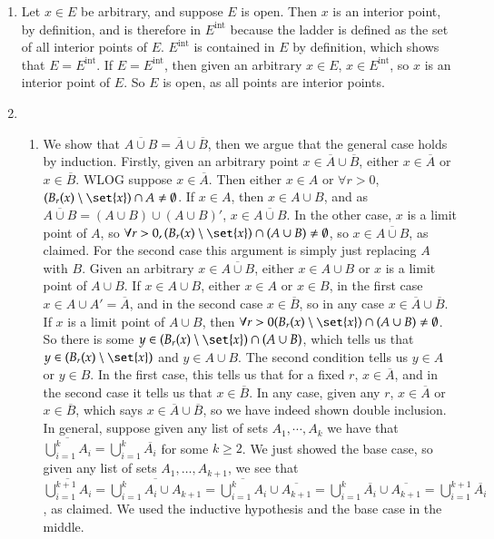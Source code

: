\documentclass[12pt]{article}
\theoremstyle{definition}
\theoremstyle{remark}
\begin{document}
\begin{enumerate}[leftmargin=\labelsep]
		\item Let $x \in E$ be arbitrary, and suppose $E$ is open. Then $x$ is an interior point, by definition, and is therefore in $E^\mathrm{int}$ because the ladder is defined as the set of all interior points of $E$. $E^\mathrm{int}$ is contained in $E$ by definition, which shows that $E = E^\mathrm{int}$. If $E = E^\mathrm{int}$, then given an arbitrary $x \in E$, $x \in E^{\mathrm{int}}$, so $x$ is an interior point of $E$. So $E$ is open, as all points are interior points.
		
		\item 
		\begin{enumerate}
			\item We show that $\overline{A \cup B} = \overline{A} \cup \overline{B}$, then we argue that the general case holds by induction. Firstly, given an arbitrary point $x \in \overline{A} \cup \overline{B}$, either $x \in \overline{A}$ or $x \in \overline{B}$. WLOG suppose $x \in \overline{A}$. Then either $x \in A$ or $\forall r > 0$, $(B_r(x) \setminus \set{x}) \cap A \neq \emptyset$. If $x \in A$, then $x \in A \cup B$, and as $\overline{A \cup B} = (A \cup B) \cup (A \cup B)'$, $x \in \overline{A\cup B}$. In the other case, $x$ is a limit point of $A$, so $\forall r > 0, (B_r(x) \setminus \set{x}) \cap (A \cup B) \neq \emptyset$, so $x \in \overline{A\cup B}$, as claimed. For the second case this argument is simply just replacing $A$ with $B$. Given an arbitrary $x \in \overline{A \cup B}$, either $x \in A \cup B$ or $x$ is a limit point of $A \cup B$. If $x \in A \cup B$, either $x \in A$ or $x \in B$, in the first case $x \in A \cup A' = \overline{A}$, and in the second case $x \in \overline{B}$, so in any case $x \in \overline{A} \cup \overline{B}$. If $x$ is a limit point of $A \cup B$, then $\forall r > 0 (B_r(x) \setminus \set{x}) \cap (A \cup B) \neq \emptyset$. So there is some $y \in (B_r(x) \setminus \set{x}) \cap (A \cup B)$, which tells us that $y \in (B_r(x) \setminus \set{x})$ and $y \in A \cup B$. The second condition tells us $y \in A$ or $y \in B$. In the first case, this tells us that for a fixed $r$, $x \in \overline{A}$, and in the second case it tells us that $x \in \overline{B}$. In any case, given any $r$, $x \in \overline{A}$ or $x \in \overline{B}$, which says $x \in \overline{A} \cup \overline{B}$, so we have indeed shown double inclusion. In general, suppose given any list of sets $A_1, \cdots, A_k$ we have that $\overline{\bigcup_{i=1}^k A_i} = \bigcup_{i=1}^k \overline{A_i}$ for some $k \geq 2$. We just showed the base case, so given any list of sets $A_1, \ldots, A_{k+1}$, we see that $\overline{\bigcup_{i=1}^{k+1} A_i} = \overline{\bigcup_{i=1}^k A_i \cup A_{k+1}} = \overline{\bigcup_{i=1}^k A_i} \cup \overline{A_{k+1}} = \bigcup_{i=1}^{k} \overline{A_i} \cup \overline{A_{k+1}} = \bigcup_{i=1}^{k+1} \overline{A_i}$, as claimed. We used the inductive hypothesis and the base case in the middle.

\end{enumerate}
\end{enumerate}
\end{document}
